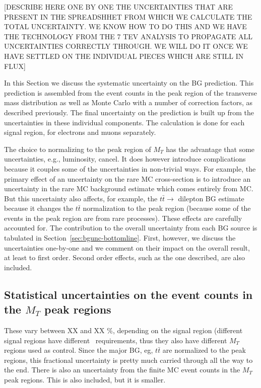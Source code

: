 
[DESCRIBE HERE ONE BY ONE THE UNCERTAINTIES THAT ARE PRESENT IN THE SPREADSHHET
FROM WHICH WE CALCULATE THE TOTAL UNCERTAINTY. WE KNOW HOW TO DO THIS
AND
WE HAVE THE TECHNOLOGY FROM THE 7 TEV ANALYSIS TO PROPAGATE ALL
UNCERTAINTIES
CORRECTLY THROUGH.  WE WILL DO IT ONCE WE HAVE SETTLED ON THE
INDIVIDUAL PIECES WHICH ARE STILL IN FLUX]

In this Section we discuss the systematic uncertainty on the BG
prediction.  This prediction is assembled from the event
counts in the peak region of the transverse mass distribution as
well as Monte Carlo 
with a number of correction factors, as described previously.
The
final uncertainty on the prediction is built up from the uncertainties in these
individual 
components. 
The calculation is done for each signal
region,
for electrons and muons separately.

The choice to normalizing to the peak region of $M_T$ has the
advantage that some uncertainties, e.g., luminosity, cancel.
It does however introduce complications because it couples
some of the uncertainties in non-trivial ways.  For example, 
the primary effect of an uncertainty on the rare MC cross-section
is to introduce an uncertainty in the rare MC background estimate
which comes entirely from MC.   But this uncertainty also affects,
for example,
the $t\bar{t} \to$ dilepton BG estimate because it changes the 
$t\bar{t}$ normalization to the peak region (because some of the 
events in the peak region are from rare processes).  These effects
are carefully accounted for.  The contribution to the overall
uncertainty from each BG source is tabulated in
Section~\ref{sec:bgunc-bottomline}.
First, however, we discuss the uncertainties one-by-one and we comment 
on their impact on the overall result, at least to first order.
Second order effects, such as the one described, are also included.

\subsection{Statistical uncertainties on the event counts in the $M_T$
peak regions}
These vary between XX and XX \%, depending on the signal region
(different
signal regions have different \met\ requirements, thus they also have
different $M_T$ regions used as control.
Since 
the major BG, eg, $t\bar{t}$ are normalized to the peak regions, this 
fractional uncertainty is pretty much carried through all the way to
the end.  There is also an uncertainty from the finite MC event counts
in the $M_T$ peak regions.  This is also included, but it is smaller.

